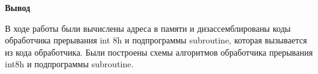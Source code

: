 \begin{center}
	{\bf\normalsize Вывод}
\end{center}

В ходе работы были вычислены адреса в памяти и дизассемблированы коды обработчика прерывания int 8h и подпрограммы subroutine, 
которая вызывается из кода обработчика. 
Были построены схемы алгоритмов обработчика прерывания int8h и подпрограммы subroutine.